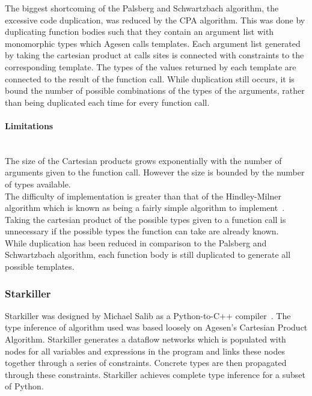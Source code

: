 \documentclass[12pt, titlepage]{article}
\begin{document}
\indent The biggest shortcoming of the Palsberg and Schwartzbach algorithm, the excessive code duplication, was reduced by the CPA algorithm. This was done by duplicating function bodies such that they contain an argument list with monomorphic types which Agesen calls templates. Each argument list generated by taking the cartesian product at calls sites is connected with constraints to the corresponding template. The types of the values returned by each template are connected to the result of the function call. While duplication still occurs, it is bound the number of possible combinations of the types of the arguments, rather than being duplicated each time for every function call.
\paragraph*{Limitations}\mbox{}\\
The size of the Cartesian products grows exponentially with the number of arguments given to the function call. However the size is bounded by the number of types available. \\
\indent The difficulty of implementation is greater than that of the Hindley-Milner algorithm which is known as being a fairly simple algorithm to implement~\cite{jones95}. \\
\indent Taking the cartesian product of the possible types given to a function call is unnecessary if the possible types the function can take are already known. \\
\indent While duplication has been reduced in comparison to the Palsberg and Schwartzbach algorithm, each function body is still duplicated to generate all possible templates.

\subsubsection{Starkiller}
Starkiller was designed by Michael Salib as a Python-to-C++ compiler~\cite{starkiller}. The type inference of algorithm used was based loosely on Agesen’s Cartesian Product Algorithm. Starkiller generates a dataflow networks which is populated with nodes for all variables and expressions in the program and links these nodes together through a series of constraints. Concrete types are then propagated through these constraints. Starkiller achieves complete type inference for a subset of Python.
\end{document}
